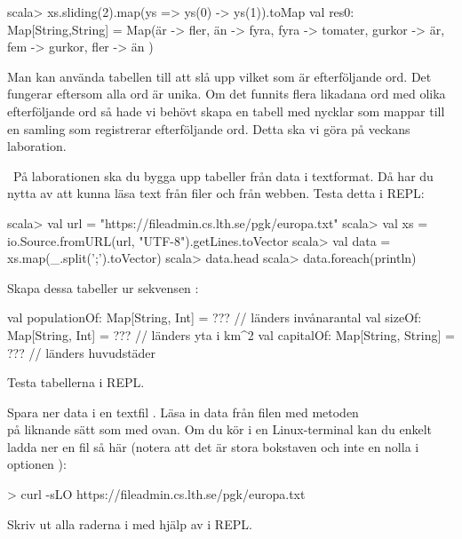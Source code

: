 \SubtaskSolved
\begin{REPL}
scala> xs.sliding(2).map(ys => ys(0) -> ys(1)).toMap
val res0: Map[String,String] =
  Map(är -> fler,
      än -> fyra,
      fyra -> tomater,
      gurkor -> är,
      fem -> gurkor,
      fler -> än
  )
\end{REPL}
Man kan använda tabellen till att slå upp vilket som är efterföljande ord. Det fungerar eftersom alla ord är unika. Om det funnits flera likadana ord med olika efterföljande ord så hade vi behövt skapa en tabell med nycklar som mappar till en samling som registrerar efterföljande ord. Detta ska vi göra på veckans laboration.

\QUESTEND





\QUESTBEGIN

\Task \what~På laborationen ska du bygga upp tabeller från data i textformat. Då har du nytta av att kunna läsa text från filer och från webben. Testa detta i REPL:
\begin{REPL}
scala> val url = "https://fileadmin.cs.lth.se/pgk/europa.txt"
scala> val xs = io.Source.fromURL(url, "UTF-8").getLines.toVector
scala> val data = xs.map(_.split(';').toVector)
scala> data.head
scala> data.foreach(println)
\end{REPL}

\Subtask Skapa dessa tabeller ur sekvensen :
\begin{Code}
val populationOf: Map[String, Int]    = ???  // länders invånarantal
val sizeOf:       Map[String, Int]    = ???  // länders yta i km^2
val capitalOf:    Map[String, String] = ???  // länders huvudstäder
\end{Code}
Testa tabellerna i REPL.

\Subtask Spara ner data i en textfil . Läsa in data från filen med metoden\\  på liknande sätt som med   ovan. Om du kör i en Linux-terminal kan du enkelt ladda ner en fil så här (notera att det är stora bokstaven  och inte en nolla i optionen ):
\begin{REPLnonum}
> curl -sLO https://fileadmin.cs.lth.se/pgk/europa.txt
\end{REPLnonum}
Skriv ut alla raderna i  med hjälp av  i REPL.

\SOLUTION

